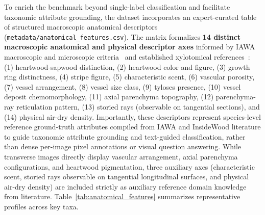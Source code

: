 \documentclass[a4paper,fleqn,12pt]{cas-sc}
\begin{document}
To enrich the benchmark beyond single-label classification and facilitate taxonomic attribute grounding, the dataset incorporates an expert-curated table of structured macroscopic anatomical descriptors (\texttt{metadata/anatomical\_features.csv}). The matrix formalizes \textbf{14 distinct macroscopic anatomical and physical descriptor axes} informed by IAWA macroscopic and microscopic criteria~\cite{iawa1989} and established xylotomical references~\cite{wiedenhoeft2011,insidewood}: (1) heartwood-sapwood distinction, (2) heartwood color and figure, (3) growth ring distinctness, (4) stripe figure, (5) characteristic scent, (6) vascular porosity, (7) vessel arrangement, (8) vessel size class, (9) tyloses presence, (10) vessel deposit chemomorphology, (11) axial parenchyma topography, (12) parenchyma-ray reticulation pattern, (13) storied rays (observable on tangential sections), and (14) physical air-dry density. Importantly, these descriptors represent species-level reference ground-truth attributes compiled from IAWA and InsideWood literature to guide taxonomic attribute grounding and text-guided classification, rather than dense per-image pixel annotations or visual question answering. While transverse images directly display vascular arrangement, axial parenchyma configurations, and heartwood pigmentation, three auxiliary axes (characteristic scent, storied rays observable on tangential longitudinal surfaces, and physical air-dry density) are included strictly as auxiliary reference domain knowledge from literature. Table~\ref{tab:anatomical_features} summarizes representative profiles across key taxa.
\end{document}
